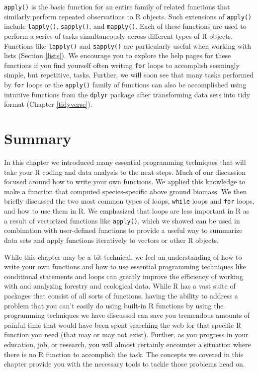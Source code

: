 \documentclass[
  11pt,
]{krantz}
\theoremstyle{definition}
\theoremstyle{definition}
\theoremstyle{definition}
\theoremstyle{definition}
\theoremstyle{remark}
\begin{document}
\texttt{apply()} is the basic function for an entire family of related functions that similarly perform repeated observations to R objects. Such extensions of \texttt{apply()} include \texttt{lapply()}, \texttt{sapply()}, and \texttt{mapply()}. Each of these functions are used to perform a series of tasks simultaneously across different types of R objects. Functions like \texttt{lapply()} and \texttt{sapply()} are particularly useful when working with lists (Section \ref{lists}). We encourage you to explore the help pages for these functions if you find yourself often writing \texttt{for} loops to accomplish seemingly simple, but repetitive, tasks. Further, we will soon see that many tasks performed by \texttt{for} loops or the \texttt{apply()} family of functions can also be accomplished using intuitive functions from the \texttt{dplyr} package after transforming data sets into tidy format (Chapter \ref{tidyverse}).

\hypertarget{summaryFunctions}{%
\section{Summary}\label{summaryFunctions}}

In this chapter we introduced many essential programming techniques that will take your R coding and data analysis to the next steps. Much of our discussion focused around how to write your own functions. We applied this knowledge to make a function that computed species-specific above ground biomass. We then briefly discussed the two most common types of loops, \texttt{while} loops and \texttt{for} loops, and how to use them in R. We emphasized that loops are less important in R as a result of vectorized functions like \texttt{apply()}, which we showed can be used in combination with user-defined functions to provide a useful way to summarize data sets and apply functions iteratively to vectors or other R objects.

While this chapter may be a bit technical, we feel an understanding of how to write your own functions and how to use essential programming techniques like conditional statements and loops can greatly improve the efficiency of working with and analyzing forestry and ecological data. While R has a vast suite of packages that consist of all sorts of functions, having the ability to address a problem that you can't easily do using built-in R functions by using the programming techniques we have discussed can save you tremendous amounts of painful time that would have been spent searching the web for that specific R function you need (that may or may not exist). Further, as you progress in your education, job, or research, you will almost certainly encounter a situation where there is no R function to accomplish the task. The concepts we covered in this chapter provide you with the necessary tools to tackle those problems head on.
\end{document}
